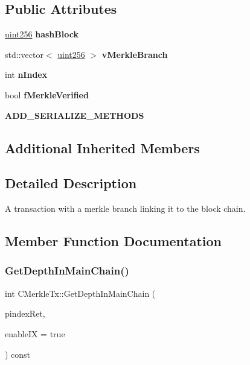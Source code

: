 \subsection*{Public Attributes}
\begin{DoxyCompactItemize}
\item 
\mbox{\label{class_c_merkle_tx_a788ee54c14b6d9706eb3737404663238}} 
\mbox{\hyperlink{classuint256}{uint256}} {\bfseries hash\+Block}
\item 
\mbox{\label{class_c_merkle_tx_a9ae6a408be914f486ebbb4161879ee69}} 
std\+::vector$<$ \mbox{\hyperlink{classuint256}{uint256}} $>$ {\bfseries v\+Merkle\+Branch}
\item 
\mbox{\label{class_c_merkle_tx_a829655e70702fdf97b6e534dd3227b0b}} 
int {\bfseries n\+Index}
\item 
\mbox{\label{class_c_merkle_tx_a3626572f7dbb86eb1c36a6570d740c7f}} 
bool {\bfseries f\+Merkle\+Verified}
\item 
\mbox{\label{class_c_merkle_tx_a86d607a3e47700ed5ebcdd4d4fcda4d7}} 
{\bfseries A\+D\+D\+\_\+\+S\+E\+R\+I\+A\+L\+I\+Z\+E\+\_\+\+M\+E\+T\+H\+O\+DS}
\end{DoxyCompactItemize}
\subsection*{Additional Inherited Members}


\subsection{Detailed Description}
A transaction with a merkle branch linking it to the block chain. 

\subsection{Member Function Documentation}
\mbox{\label{class_c_merkle_tx_a5bf3a355593ecce5799de92d013149b1}} 
\subsubsection{\texorpdfstring{Get\+Depth\+In\+Main\+Chain()}{GetDepthInMainChain()}}
{\footnotesize\ttfamily int C\+Merkle\+Tx\+::\+Get\+Depth\+In\+Main\+Chain (\begin{DoxyParamCaption}\item[{const \mbox{\hyperlink{class_c_block_index}{C\+Block\+Index}} $\ast$\&}]{pindex\+Ret,  }\item[{bool}]{enable\+IX = {\ttfamily true} }\end{DoxyParamCaption}) const}

